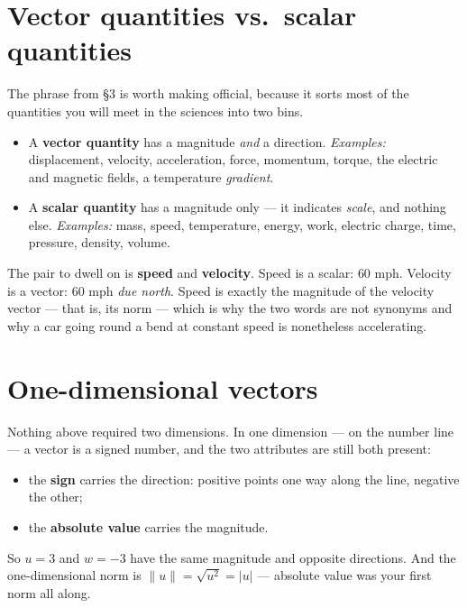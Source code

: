 \documentclass[11pt]{article}
\theoremstyle{definition}
\theoremstyle{remark}
\newcommand{\norm}[1]{\lVert #1\rVert}
\begin{document}
\section{Vector quantities vs.\ scalar quantities}
The phrase from \S3 is worth making official, because it sorts most of the
quantities you will meet in the sciences into two bins.

\begin{itemize}[leftmargin=1.4em,itemsep=3pt]
  \item A \textbf{vector quantity} has a magnitude \emph{and} a direction.
        \emph{Examples:} displacement, velocity, acceleration, force, momentum,
        torque, the electric and magnetic fields, a temperature \emph{gradient}.
  \item A \textbf{scalar quantity} has a magnitude only --- it indicates
        \emph{scale}, and nothing else. \emph{Examples:} mass, speed,
        temperature, energy, work, electric charge, time, pressure, density,
        volume.
\end{itemize}

\noindent The pair to dwell on is \textbf{speed} and \textbf{velocity}. Speed is
a scalar: $60$ mph. Velocity is a vector: $60$ mph \emph{due north}. Speed is
exactly the magnitude of the velocity vector --- that is, its norm --- which is
why the two words are not synonyms and why a car going round a bend at constant
speed is nonetheless accelerating.

\section{One-dimensional vectors}
Nothing above required two dimensions. In one dimension --- on the number line
--- a vector is a signed number, and the two attributes are still both present:

\begin{itemize}[leftmargin=1.4em,itemsep=2pt]
  \item the \textbf{sign} carries the direction: positive points one way along
        the line, negative the other;
  \item the \textbf{absolute value} carries the magnitude.
\end{itemize}

\noindent So $u=3$ and $w=-3$ have the same magnitude and opposite directions.
And the one-dimensional norm is
$\norm{u}=\sqrt{u^{2}}=\lvert u\rvert$ --- absolute value was your first norm
all along.
\end{document}
